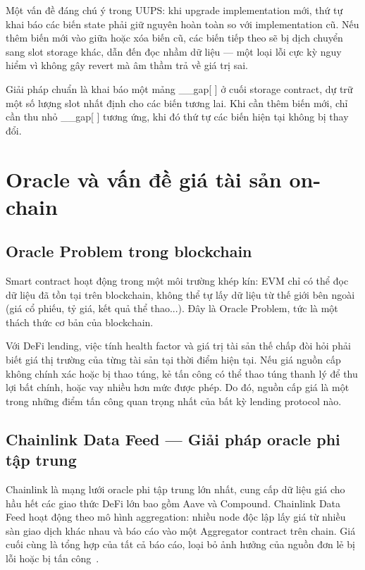 \documentclass[../DoAn.tex]{subfiles}
\begin{document}
Một vấn đề đáng chú ý trong UUPS: khi upgrade implementation mới, thứ tự khai báo các biến state phải giữ nguyên hoàn toàn so với implementation cũ. Nếu thêm biến mới vào giữa hoặc xóa biến cũ, các biến tiếp theo sẽ bị dịch chuyển sang slot storage khác, dẫn đến đọc nhầm dữ liệu --- một loại lỗi cực kỳ nguy hiểm vì không gây revert mà âm thầm trả về giá trị sai.

Giải pháp chuẩn là khai báo một mảng \_\_gap[ ] ở cuối storage contract, dự trữ một số lượng slot nhất định cho các biến tương lai. Khi cần thêm biến mới, chỉ cần thu nhỏ \_\_gap[ ] tương ứng, khi đó thứ tự các biến hiện tại không bị thay đổi.

\section{Oracle và vấn đề giá tài sản on-chain}


\subsection{Oracle Problem trong blockchain}


Smart contract hoạt động trong một môi trường khép kín: EVM chỉ có thể đọc dữ liệu đã tồn tại trên blockchain, không thể tự lấy dữ liệu từ thế giới bên ngoài (giá cổ phiếu, tỷ giá, kết quả thể thao...). Đây là Oracle Problem, tức là một thách thức cơ bản của blockchain.

Với DeFi lending, việc tính health factor và giá trị tài sản thế chấp đòi hỏi phải biết giá thị trường của từng tài sản tại thời điểm hiện tại. Nếu giá nguồn cấp không chính xác hoặc bị thao túng, kẻ tấn công có thể thao túng thanh lý để thu lợi bất chính, hoặc vay nhiều hơn mức được phép. Do đó, nguồn cấp giá là một trong những điểm tấn công quan trọng nhất của bất kỳ lending protocol nào.

\subsection{Chainlink Data Feed --- Giải pháp oracle phi tập trung}


Chainlink là mạng lưới oracle phi tập trung lớn nhất, cung cấp dữ liệu giá cho hầu hết các giao thức DeFi lớn bao gồm Aave và Compound. Chainlink Data Feed hoạt động theo mô hình aggregation: nhiều node độc lập lấy giá từ nhiều sàn giao dịch khác nhau và báo cáo vào một Aggregator contract trên chain. Giá cuối cùng là tổng hợp của tất cả báo cáo, loại bỏ ảnh hưởng của nguồn đơn lẻ bị lỗi hoặc bị tấn công~\cite{ChainlinkDocs}.
\end{document}
